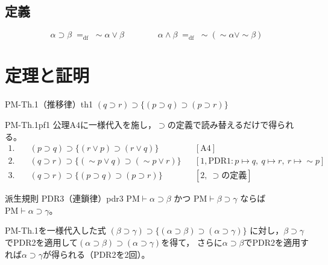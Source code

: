 \documentclass[autodetect-engine,dvi=dvipdfmx,ja=standard]{bxjsarticle}
\begin{document}
\subsection*{定義}

\[
  \alpha\supset\beta\;\mathrel{=_{\mathrm{df}}}\;\sim\alpha\lor\beta
  \qquad\qquad
  \alpha\land\beta\;\mathrel{=_{\mathrm{df}}}\;\sim(\sim\alpha\lor\sim\beta)
\]

\section{定理と証明}

\begin{theorem}{PM-Th.1（推移律）}{th1}
\((q\supset r)\supset\{(p\supset q)\supset(p\supset r)\}\)
\end{theorem}
\begin{tproof}{PM-Th.1}{pf1}
公理\(\mathrm{A4}\)に一様代入を施し，\(\supset\)の定義で読み替えるだけで得られる。
\begin{align*}
  1.\quad & (p\supset q)\supset\{(r\lor p)\supset(r\lor q)\} && [\mathrm{A4}]\\
  2.\quad & (q\supset r)\supset\{(\sim p\lor q)\supset(\sim p\lor r)\}
    && [1,\mathrm{PDR1}: p\mapsto q,\ q\mapsto r,\ r\mapsto\sim p]\\
  3.\quad & (q\supset r)\supset\{(p\supset q)\supset(p\supset r)\}
    && [2,\ \supset\text{の定義}]
\end{align*}
\end{tproof}

\begin{remark}{派生規則 PDR3（連鎖律）}{pdr3}
\(\mathrm{PM}\vdash\alpha\supset\beta\) かつ \(\mathrm{PM}\vdash\beta\supset\gamma\) ならば
\(\mathrm{PM}\vdash\alpha\supset\gamma\)。

PM-Th.1を一様代入した式 \((\beta\supset\gamma)\supset\{(\alpha\supset\beta)\supset(\alpha\supset\gamma)\}\)
に対し，\(\beta\supset\gamma\)でPDR2を適用して\((\alpha\supset\beta)\supset(\alpha\supset\gamma)\)を得て，
さらに\(\alpha\supset\beta\)でPDR2を適用すれば\(\alpha\supset\gamma\)が得られる（PDR2を2回）。
\end{remark}
\end{document}
